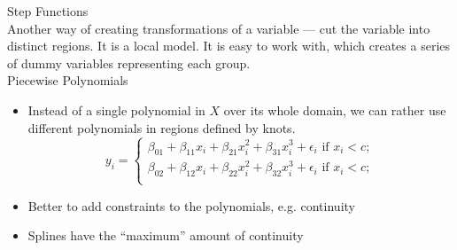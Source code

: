\documentclass[11pt, a4paper]{article}
\begin{document}
Step Functions\\
Another way of creating transformations of a variable --- cut the variable into distinct regions. It is a local model. It is easy to work with, which creates a series of dummy variables representing each group.\\[1mm]
Piecewise Polynomials
\begin{itemize}
\item Instead of a single polynomial in $X$ over its whole domain, we can rather use different polynomials in regions defined by knots.
  \[
    y_i= \begin{cases} 
      \beta_{01}+\beta_{11}x_i+\beta_{21}x_i^2+\beta_{31}x_i^3+\epsilon_i \text{ if }x_i<c; \\
      \beta_{02}+\beta_{12}x_i+\beta_{22}x_i^2+\beta_{32}x_i^3+\epsilon_i \text{ if }x_i<c; \\
    \end{cases} 
  \]
\item Better to add constraints to the polynomials, e.g. continuity
\item Splines have the ``maximum'' amount of continuity
\end{itemize}
\end{document}
